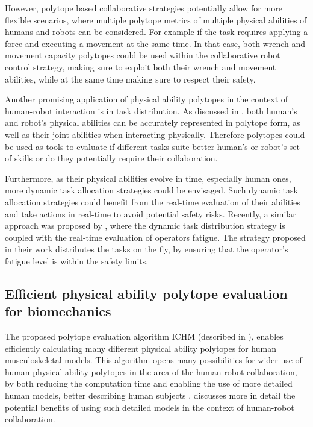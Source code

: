 However, polytope based collaborative strategies potentially allow for more flexible scenarios, where multiple polytope metrics of multiple physical abilities of humans and robots can be considered. For example if the task requires applying a force and executing a movement at the same time. In that case, both wrench and movement capacity polytopes could be used within the collaborative robot control strategy, making sure to exploit both their wrench and movement abilities, while at the same time making sure to respect their safety.

Another promising application of physical ability polytopes in the context of human-robot interaction is in task distribution. As discussed in , both human's and robot's physical abilities can be accurately represented in polytope form, as well as their joint abilities when interacting physically. Therefore polytopes could be used as tools to evaluate if different tasks suite better human's or robot's set of skills or do they potentially require their collaboration. 

Furthermore, as their physical abilities evolve in time, especially human ones, more dynamic task allocation strategies could be envisaged. Such dynamic task allocation strategies could benefit from the real-time evaluation of their abilities and take actions in real-time to avoid potential safety risks. Recently, a similar approach was proposed by \citet{Messeri2022allocation}, where the dynamic task distribution strategy is coupled with the real-time evaluation of operators fatigue. The strategy proposed in their work distributes the tasks on the fly, by ensuring that the operator's fatigue level is within the safety limits.  



\subsection{Efficient physical ability polytope evaluation for biomechanics}

The proposed polytope evaluation algorithm ICHM (described in ), enables efficiently calculating many different physical ability polytopes for human musculoskeletal models. 
This algorithm opens many possibilities for wider use of human physical ability polytopes in the area of the human-robot collaboration, by both reducing the computation time and enabling the use of more detailed human models, better describing human subjects \cite{sohn2019effects}.  discusses more in detail the potential benefits of using such detailed models in the context of human-robot collaboration.


